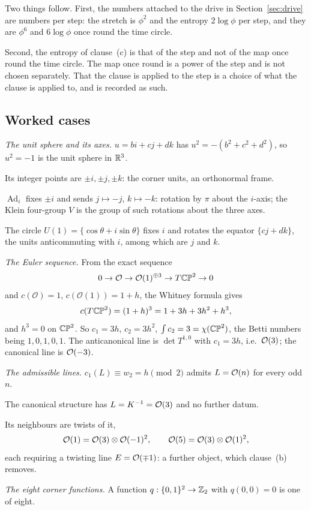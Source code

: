 \documentclass[11pt,a4paper]{article}
\theoremstyle{plain}
\theoremstyle{definition}
\theoremstyle{remark}
\newcommand{\Ad}{\operatorname{Ad}}
\begin{document}
Two things follow. First, the numbers attached to the drive in Section~\ref{sec:drive} are numbers per step: the stretch is $\phi^{2}$ and the entropy $2\log\phi$ per step, and they are $\phi^{6}$ and $6\log\phi$ once round the time circle.

Second, the entropy of clause~(c) is that of the step and not of the map once round the time circle. The map once round is a power of the step and is not chosen separately. That the clause is applied to the step is a choice of what the clause is applied to, and is recorded as such.

\subsection{Worked cases}\label{sec:base-worked}

\emph{The unit sphere and its axes.} $u=bi+cj+dk$ has $u^{2}=-(b^{2}+c^{2}+d^{2})$, so $u^{2}=-1$ is the unit sphere in $\mathbb{R}^{3}$.

Its integer points are $\pm i,\pm j,\pm k$: the corner units, an orthonormal frame.

$\Ad_{i}$ fixes $\pm i$ and sends $j\mapsto-j$, $k\mapsto-k$: rotation by $\pi$ about the $i$-axis; the Klein four-group $V$ is the group of such rotations about the three axes.

The circle $U(1)=\{\cos\theta+i\sin\theta\}$ fixes $i$ and rotates the equator $\{cj+dk\}$, the units anticommuting with $i$, among which are $j$ and $k$.

\emph{The Euler sequence.} From the exact sequence
\[
0\to\mathcal{O}\to\mathcal{O}(1)^{\oplus3}\to T\mathbb{CP}^2\to0
\]
and $c(\mathcal{O})=1$, $c(\mathcal{O}(1))=1+h$, the Whitney formula gives
\[
c(T\mathbb{CP}^2)=(1+h)^{3}=1+3h+3h^{2}+h^{3},
\]
and $h^{3}=0$ on $\mathbb{CP}^2$. So $c_{1}=3h$, $c_{2}=3h^{2}$, $\int c_{2}=3=\chi(\mathbb{CP}^2)$, the Betti numbers being $1,0,1,0,1$. The anticanonical line is $\det T^{1,0}$ with $c_{1}=3h$, i.e.\ $\mathcal{O}(3)$; the canonical line is $\mathcal{O}(-3)$.

\emph{The admissible lines.} $c_{1}(L)\equiv w_{2}=h\pmod2$ admits $L=\mathcal{O}(n)$ for every odd $n$.

The canonical structure has $L=K^{-1}=\mathcal{O}(3)$ and no further datum.

Its neighbours are twists of it,
\[
\mathcal{O}(1)=\mathcal{O}(3)\otimes\mathcal{O}(-1)^{2},\qquad \mathcal{O}(5)=\mathcal{O}(3)\otimes\mathcal{O}(1)^{2},
\]
each requiring a twisting line $E=\mathcal{O}(\mp1)$: a further object, which clause~(b) removes.

\emph{The eight corner functions.} A function $q:\{0,1\}^{2}\to\mathbb{Z}_{2}$ with $q(0,0)=0$ is one of eight.
\end{document}
